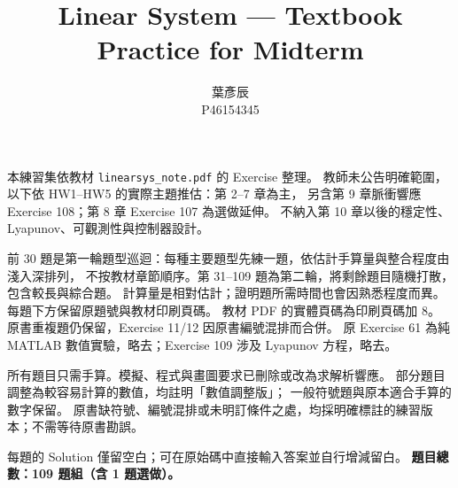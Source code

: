 \documentclass[12pt,a4paper]{article}
\title{Linear System --- Textbook Practice for Midterm}
\author{葉彥辰\\P46154345}
\date{}
\begin{document}
\maketitle
本練習集依教材 \texttt{linearsys\_note.pdf} 的 Exercise 整理。
教師未公告明確範圍，以下依 HW1--HW5 的實際主題推估：第 2--7 章為主，
另含第 9 章脈衝響應 Exercise 108；第 8 章 Exercise 107 為選做延伸。
不納入第 10 章以後的穩定性、Lyapunov、可觀測性與控制器設計。

前 30 題是第一輪題型巡迴：每種主要題型先練一題，依估計手算量與整合程度由淺入深排列，
不按教材章節順序。第 31--109 題為第二輪，將剩餘題目隨機打散，包含較長與綜合題。
計算量是相對估計；證明題所需時間也會因熟悉程度而異。
每題下方保留原題號與教材印刷頁碼。
教材 PDF 的實體頁碼為印刷頁碼加 8。
原書重複題仍保留，Exercise 11/12 因原書編號混排而合併。
原 Exercise 61 為純 MATLAB 數值實驗，略去；Exercise 109 涉及 Lyapunov 方程，略去。

所有題目只需手算。模擬、程式與畫圖要求已刪除或改為求解析響應。
部分題目調整為較容易計算的數值，均註明「數值調整版」；
一般符號題與原本適合手算的數字保留。
原書缺符號、編號混排或未明訂條件之處，均採明確標註的練習版本；不需等待原書勘誤。

每題的 Solution 僅留空白；可在原始碼中直接輸入答案並自行增減留白。
\bigskip
\textbf{題目總數：109 題組（含 1 題選做）。}
\clearpage
\end{document}
